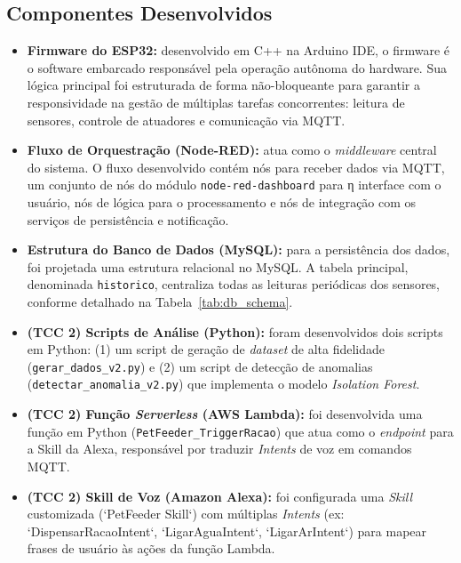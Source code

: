 \subsection{Componentes Desenvolvidos}
\begin{itemize}
    \item \textbf{Firmware do ESP32:} desenvolvido em C++ na Arduino IDE, o firmware é o software embarcado responsável pela operação autônoma do hardware.
Sua lógica principal foi estruturada de forma não-bloqueante para garantir a responsividade na gestão de múltiplas tarefas concorrentes: leitura de sensores, controle de atuadores e comunicação via MQTT.
\item \textbf{Fluxo de Orquestração (Node-RED):} atua como o \textit{middleware} central do sistema.
O fluxo desenvolvido contém nós para receber dados via MQTT, um conjunto de nós do módulo \texttt{node-red-dashboard} para η interface com o usuário, nós de lógica para o processamento e nós de integração com os serviços de persistência e notificação.
\item \textbf{Estrutura do Banco de Dados (MySQL):} para a persistência dos dados, foi projetada uma estrutura relacional no MySQL.
A tabela principal, denominada \texttt{historico}, centraliza todas as leituras periódicas dos sensores, conforme detalhado na Tabela~\ref{tab:db_schema}.
\item \textbf{(TCC 2) Scripts de Análise (Python):} foram desenvolvidos dois scripts em Python: (1) um script de geração de \textit{dataset} de alta fidelidade (\texttt{gerar\_dados\_v2.py}) e (2) um script de detecção de anomalias (\texttt{detectar\_anomalia\_v2.py}) que implementa o modelo \textit{Isolation Forest}.
\item \textbf{(TCC 2) Função \textit{Serverless} (AWS Lambda):} foi desenvolvida uma função em Python (\texttt{PetFeeder\_TriggerRacao}) que atua como o \textit{endpoint} para a Skill da Alexa, responsável por traduzir \textit{Intents} de voz em comandos MQTT.
\item \textbf{(TCC 2) Skill de Voz (Amazon Alexa):} foi configurada uma \textit{Skill} customizada (`PetFeeder Skill`) com múltiplas \textit{Intents} (ex: `DispensarRacaoIntent`, `LigarAguaIntent`, `LigarArIntent`) para mapear frases de usuário às ações da função Lambda.
\end{itemize}

